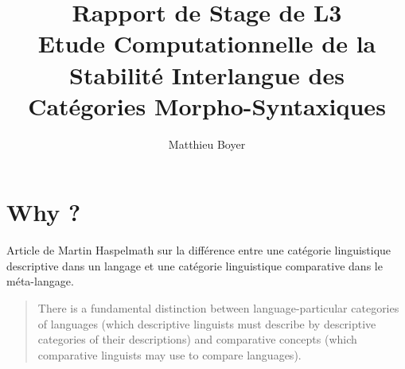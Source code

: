\documentclass{cours}
\title{Rapport de Stage de L3\\
{\small \sc Etude Computationnelle de la Stabilité Interlangue des Catégories Morpho-Syntaxiques}}
\author{Matthieu Boyer}
\begin{document}
\section{Why ?}
Article de Martin Haspelmath sur la différence entre une catégorie linguistique descriptive dans un langage et une catégorie linguistique comparative dans le méta-langage.
\begin{quote}
	There is a fundamental distinction between language-particular categories of languages (which descriptive linguists must describe by descriptive categories of their descriptions) and comparative concepts (which comparative linguists may use to compare languages).
\end{quote}
\end{document}

